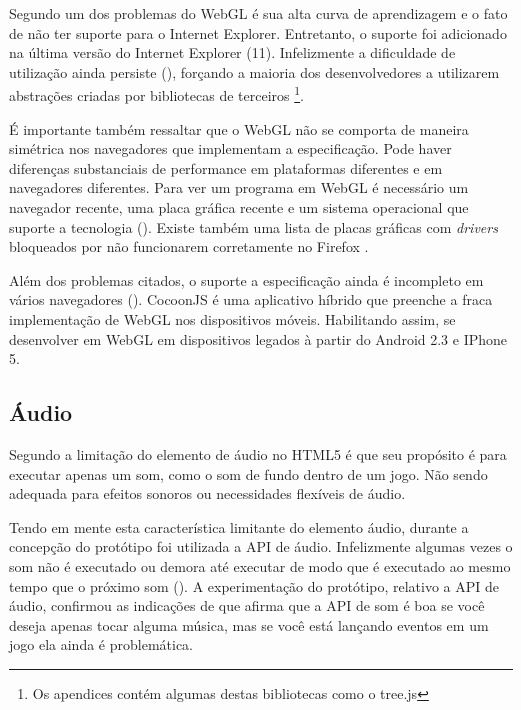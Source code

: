 Segundo \citet{html5mostwanted} um dos problemas do WebGL é sua alta
curva de aprendizagem e o fato de não ter suporte para o Internet
Explorer. Entretanto, o suporte foi adicionado na última versão do
Internet Explorer (11). Infelizmente a dificuldade de utilização
ainda persiste (), forçando a maioria dos
desenvolvedores a utilizarem abstrações criadas por bibliotecas de
terceiros \footnote{Os apendices contém algumas destas bibliotecas como
o tree.js}.

É importante também ressaltar que o WebGL não se comporta de
maneira simétrica nos navegadores que implementam a especificação.
Pode haver diferenças substanciais de performance em plataformas
diferentes e em navegadores diferentes. Para ver um programa em WebGL
é necessário um navegador recente, uma placa gráfica recente e um
sistema operacional que suporte a tecnologia \autocite{html5mostwanted}
(). Existe também uma lista de
placas gráficas com \textit{drivers} bloqueados por não funcionarem
corretamente no Firefox \autocite[p.42]{3daps}.

Além dos problemas citados, o suporte a especificação ainda é
incompleto em vários navegadores ().
CocoonJS é uma aplicativo híbrido que preenche a fraca implementação
de WebGL nos dispositivos móveis. Habilitando assim, se desenvolver em WebGL
em dispositivos legados à partir do Android 2.3 e IPhone 5.

\subsection{Áudio}

Segundo \citet{html5mostwanted} a limitação do elemento de áudio no
HTML5 é que seu propósito é para executar apenas um som, como o som
de fundo dentro de um jogo. Não sendo adequada para efeitos sonoros
ou necessidades flexíveis de áudio.

Tendo em mente esta característica limitante do elemento áudio,
durante a concepção do protótipo foi utilizada a API de áudio.
Infelizmente algumas vezes o som não é executado ou demora até
executar de modo que é executado ao mesmo tempo que o próximo
som (). A experimentação do
protótipo, relativo a API de áudio, confirmou as indicações de
\citet{html5mostwanted} que afirma que a API de som é boa se você
deseja apenas tocar alguma música, mas se você está lançando eventos
em um jogo ela ainda é problemática.

